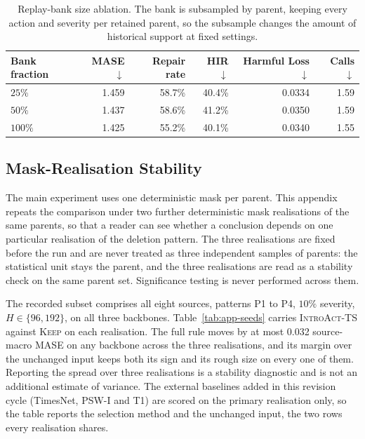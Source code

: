 \documentclass{article}
\newcommand{\introact}{\textsc{IntroAct-TS}}
\begin{document}
\begin{table}[!t]
  \caption{Replay-bank size ablation. The bank is subsampled by parent, keeping
  every action and severity per retained parent, so the subsample changes the amount of
  historical support at fixed settings.}
  \label{tab:app-replaysize}
  \centering
  \small
  \setlength{\tabcolsep}{4pt}
  \begin{tabular*}{\textwidth}{@{\extracolsep{\fill}}lrrrrr@{}}
    \toprule
    Bank fraction & MASE $\downarrow$ & Repair rate & HIR $\downarrow$ & Harmful Loss $\downarrow$ & Calls $\downarrow$ \\
    \midrule
    $25\%$  & 1.459 & 58.7\% & 40.4\% & 0.0334 & 1.59 \\
    $50\%$  & 1.437 & 58.6\% & 41.2\% & 0.0350 & 1.59 \\
    $100\%$ & 1.425 & 55.2\% & 40.1\% & 0.0340 & 1.55 \\
    \bottomrule
  \end{tabular*}
\end{table}

\subsection{Mask-Realisation Stability}
\label{app:seeds}
The main experiment uses one deterministic mask per parent. This appendix repeats the
comparison under two further deterministic mask realisations of the same parents, so that a
reader can see whether a conclusion depends on one particular realisation of the deletion
pattern. The three realisations are fixed before the run and are never treated as three
independent samples of parents: the statistical unit stays the parent, and the three
realisations are read as a stability check on the same parent set. Significance testing is
never performed across them.

The recorded subset comprises all eight sources, patterns P1 to P4, $10\%$ severity,
$H \in \{96,192\}$, on all three backbones. Table~\ref{tab:app-seeds} carries \introact{}
against \textsc{Keep} on each realisation. The full rule moves by at most 0.032 source-macro
MASE on any backbone across the three realisations, and its margin over the unchanged input
keeps both its sign and its rough size on every one of them. Reporting the spread over three
realisations is a stability diagnostic and is not an additional estimate of variance. The
external baselines added in this revision cycle (TimesNet, PSW-I and T1) are scored on the
primary realisation only, so the table reports the selection method and the unchanged
input, the two rows every realisation shares.
\end{document}
